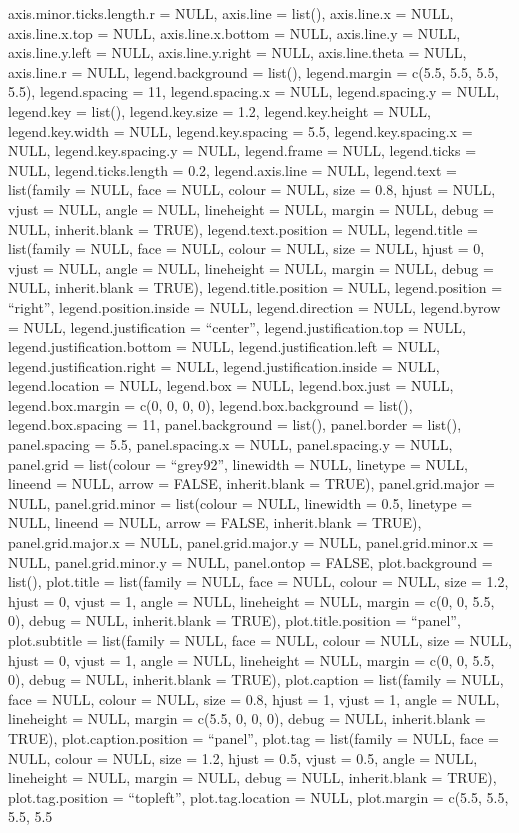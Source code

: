 \documentclass[
  man,floatsintext]{apa6}
\begin{document}
axis.minor.ticks.length.r = NULL, axis.line = list(), axis.line.x = NULL, axis.line.x.top = NULL, axis.line.x.bottom = NULL, axis.line.y = NULL, axis.line.y.left = NULL, axis.line.y.right = NULL, axis.line.theta = NULL, axis.line.r = NULL, legend.background = list(), legend.margin = c(5.5, 5.5, 5.5, 5.5), legend.spacing = 11, legend.spacing.x = NULL, legend.spacing.y = NULL, legend.key = list(), legend.key.size = 1.2, legend.key.height = NULL, legend.key.width = NULL, legend.key.spacing = 5.5,
legend.key.spacing.x = NULL, legend.key.spacing.y = NULL, legend.frame = NULL, legend.ticks = NULL, legend.ticks.length = 0.2, legend.axis.line = NULL, legend.text = list(family = NULL, face = NULL, colour = NULL, size = 0.8, hjust = NULL, vjust = NULL, angle = NULL, lineheight = NULL, margin = NULL, debug = NULL, inherit.blank = TRUE), legend.text.position = NULL, legend.title = list(family = NULL, face = NULL, colour = NULL, size = NULL, hjust = 0, vjust = NULL, angle = NULL, lineheight = NULL,
margin = NULL, debug = NULL, inherit.blank = TRUE), legend.title.position = NULL, legend.position = ``right'', legend.position.inside = NULL, legend.direction = NULL, legend.byrow = NULL, legend.justification = ``center'', legend.justification.top = NULL, legend.justification.bottom = NULL, legend.justification.left = NULL, legend.justification.right = NULL, legend.justification.inside = NULL, legend.location = NULL, legend.box = NULL, legend.box.just = NULL, legend.box.margin = c(0, 0, 0, 0),
legend.box.background = list(), legend.box.spacing = 11, panel.background = list(), panel.border = list(), panel.spacing = 5.5, panel.spacing.x = NULL, panel.spacing.y = NULL, panel.grid = list(colour = ``grey92'', linewidth = NULL, linetype = NULL, lineend = NULL, arrow = FALSE, inherit.blank = TRUE), panel.grid.major = NULL, panel.grid.minor = list(colour = NULL, linewidth = 0.5, linetype = NULL, lineend = NULL, arrow = FALSE, inherit.blank = TRUE), panel.grid.major.x = NULL, panel.grid.major.y = NULL,
panel.grid.minor.x = NULL, panel.grid.minor.y = NULL, panel.ontop = FALSE, plot.background = list(), plot.title = list(family = NULL, face = NULL, colour = NULL, size = 1.2, hjust = 0, vjust = 1, angle = NULL, lineheight = NULL, margin = c(0, 0, 5.5, 0), debug = NULL, inherit.blank = TRUE), plot.title.position = ``panel'', plot.subtitle = list(family = NULL, face = NULL, colour = NULL, size = NULL, hjust = 0, vjust = 1, angle = NULL, lineheight = NULL, margin = c(0, 0, 5.5, 0), debug = NULL, inherit.blank = TRUE),
plot.caption = list(family = NULL, face = NULL, colour = NULL, size = 0.8, hjust = 1, vjust = 1, angle = NULL, lineheight = NULL, margin = c(5.5, 0, 0, 0), debug = NULL, inherit.blank = TRUE), plot.caption.position = ``panel'', plot.tag = list(family = NULL, face = NULL, colour = NULL, size = 1.2, hjust = 0.5, vjust = 0.5, angle = NULL, lineheight = NULL, margin = NULL, debug = NULL, inherit.blank = TRUE), plot.tag.position = ``topleft'', plot.tag.location = NULL, plot.margin = c(5.5, 5.5, 5.5, 5.5
\end{document}
